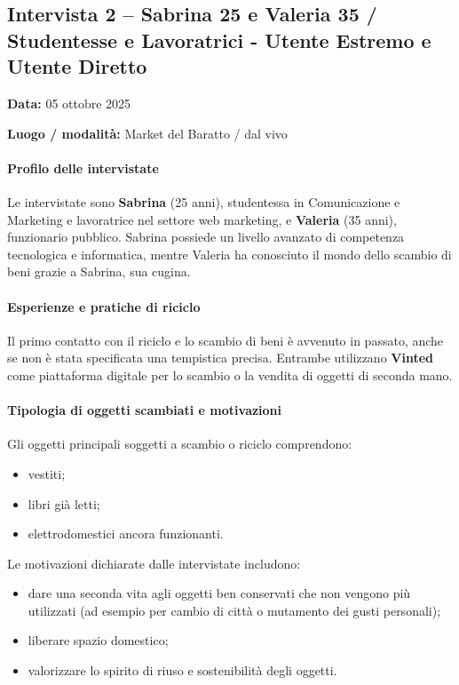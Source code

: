 \documentclass[12pt,a4paper]{article}
\begin{document}
\newpage

\subsection{Intervista 2 – Sabrina 25 e Valeria 35 / Studentesse e Lavoratrici - Utente Estremo e Utente Diretto}

\textbf{Data:} 05 ottobre 2025  


\textbf{Luogo / modalità:} Market del Baratto / dal vivo 

\paragraph{Profilo delle intervistate}

Le intervistate sono \textbf{Sabrina} (25 anni), studentessa in Comunicazione e Marketing e lavoratrice nel settore web marketing, e \textbf{Valeria} (35 anni), funzionario pubblico.  
Sabrina possiede un livello avanzato di competenza tecnologica e informatica, mentre Valeria ha conosciuto il mondo dello scambio di beni grazie a Sabrina, sua cugina.

\paragraph{Esperienze e pratiche di riciclo}

Il primo contatto con il riciclo e lo scambio di beni è avvenuto in passato, anche se non è stata specificata una tempistica precisa. Entrambe utilizzano \textbf{Vinted} come piattaforma digitale per lo scambio o la vendita di oggetti di seconda mano.

\paragraph{Tipologia di oggetti scambiati e motivazioni}

Gli oggetti principali soggetti a scambio o riciclo comprendono:
\begin{itemize}
  \item vestiti;
  \item libri già letti;
  \item elettrodomestici ancora funzionanti.
\end{itemize}

Le motivazioni dichiarate dalle intervistate includono:
\begin{itemize}
  \item dare una seconda vita agli oggetti ben conservati che non vengono più utilizzati (ad esempio per cambio di città o mutamento dei gusti personali);
  \item liberare spazio domestico;
  \item valorizzare lo spirito di riuso e sostenibilità degli oggetti.
\end{itemize}
\end{document}
